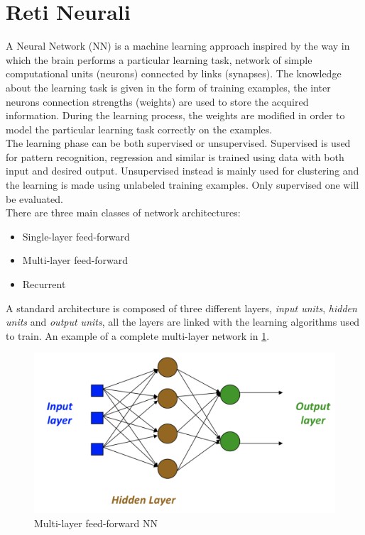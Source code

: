 \documentclass[%
    corpo=12pt,
    twoside,
    oldstyle,
    autoretitolo,
    greek,
    evenboxes,
]{toptesi}
\begin{document}
\section{Reti Neurali}
A Neural Network (NN) is a machine learning approach inspired by the way in which the brain performs a particular learning task, network of simple computational units (neurons) connected by links (synapses). The knowledge about the learning task is given in the form of training examples, the inter neurons connection strengths (weights) are used to store the acquired information. During the learning process, the weights are modified in order to model the particular learning task correctly on the examples.\\
The learning phase can be both supervised or unsupervised. Supervised is used for pattern recognition, regression and similar is trained using data with both input and desired output. Unsupervised instead is mainly used for clustering and the learning is made using unlabeled training examples. Only supervised one will be evaluated.\\
There are three main classes of network architectures:
\begin{itemize}
  \item Single-layer feed-forward
  \item Multi-layer feed-forward
  \item Recurrent
\end{itemize}
A standard architecture is composed of three different layers, \textit{input units}, \textit{hidden units} and \textit{output units}, all the layers are linked with the learning algorithms used to train. An example of a complete multi-layer network in \ref{fig:mlff}.

\begin{figure}[!ht]
  \includegraphics[width=\linewidth]{figure/feed_foward.png}
  \caption{Multi-layer feed-forward NN}
  \label{fig:mlff}
\end{figure}
\end{document}
